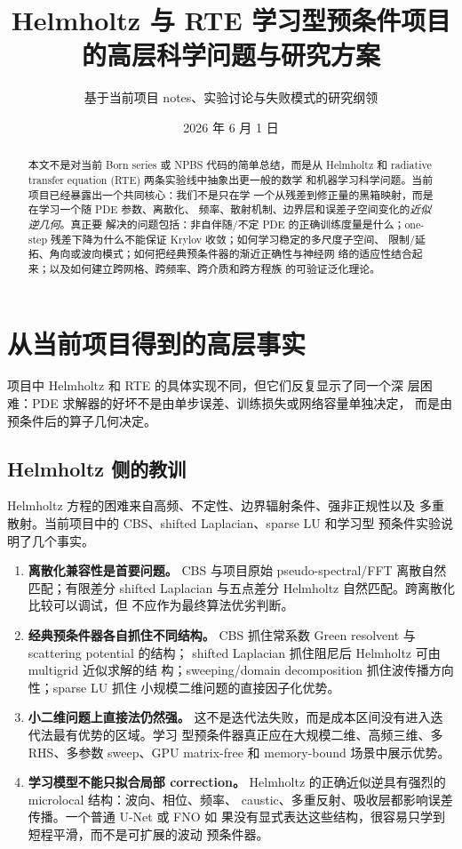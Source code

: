 \documentclass[UTF8,11pt,fontset=fandol]{ctexart}
\title{Helmholtz 与 RTE 学习型预条件项目的高层科学问题与研究方案}
\author{基于当前项目 notes、实验讨论与失败模式的研究纲领}
\date{2026 年 6 月 1 日}
\begin{document}
\maketitle

\begin{abstract}
本文不是对当前 Born series 或 NPBS 代码的简单总结，而是从 Helmholtz
和 radiative transfer equation (RTE) 两条实验线中抽象出更一般的数学
和机器学习科学问题。当前项目已经暴露出一个共同核心：我们不是只在学
一个从残差到修正量的黑箱映射，而是在学习一个随 PDE 参数、离散化、
频率、散射机制、边界层和误差子空间变化的\emph{近似逆几何}。真正要
解决的问题包括：非自伴随/不定 PDE 的正确训练度量是什么；one-step
残差下降为什么不能保证 Krylov 收敛；如何学习稳定的多尺度子空间、
限制/延拓、角向或波向模式；如何把经典预条件器的渐近正确性与神经网
络的适应性结合起来；以及如何建立跨网格、跨频率、跨介质和跨方程族
的可验证泛化理论。
\end{abstract}

\tableofcontents

\section{从当前项目得到的高层事实}

项目中 Helmholtz 和 RTE 的具体实现不同，但它们反复显示了同一个深
层困难：PDE 求解器的好坏不是由单步误差、训练损失或网络容量单独决定，
而是由预条件后的算子几何决定。

\subsection{Helmholtz 侧的教训}

Helmholtz 方程的困难来自高频、不定性、边界辐射条件、强非正规性以及
多重散射。当前项目中的 CBS、shifted Laplacian、sparse LU 和学习型
预条件实验说明了几个事实。

\begin{enumerate}[leftmargin=2em]
  \item \textbf{离散化兼容性是首要问题。}
  CBS 与项目原始 pseudo-spectral/FFT 离散自然匹配；有限差分 shifted
  Laplacian 与五点差分 Helmholtz 自然匹配。跨离散化比较可以调试，但
  不应作为最终算法优劣判断。

  \item \textbf{经典预条件器各自抓住不同结构。}
  CBS 抓住常系数 Green resolvent 与 scattering potential 的结构；
  shifted Laplacian 抓住阻尼后 Helmholtz 可由 multigrid 近似求解的结
  构；sweeping/domain decomposition 抓住波传播方向性；sparse LU 抓住
  小规模二维问题的直接因子化优势。

  \item \textbf{小二维问题上直接法仍然强。}
  这不是迭代法失败，而是成本区间没有进入迭代法最有优势的区域。学习
  型预条件器真正应在大规模二维、高频三维、多 RHS、多参数 sweep、GPU
  matrix-free 和 memory-bound 场景中展示优势。

  \item \textbf{学习模型不能只拟合局部 correction。}
  Helmholtz 的正确近似逆具有强烈的 microlocal 结构：波向、相位、频率、
  caustic、多重反射、吸收层都影响误差传播。一个普通 U-Net 或 FNO 如
  果没有显式表达这些结构，很容易只学到短程平滑，而不是可扩展的波动
  预条件器。
\end{enumerate}
\end{document}
